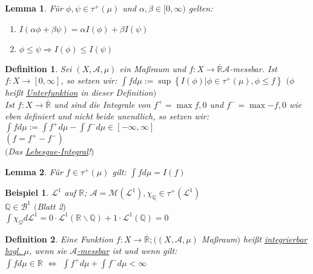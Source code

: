 \documentclass[11pt]{memoir}
\theoremstyle{changebreak}
\newtheorem{Definition}{Definition}[chapter]
\newtheorem{Beispiel}{Beispiel}[chapter]
\newtheorem{Lemma}{Lemma}[chapter]
\begin{document}
\begin{Lemma}
Für $\phi, \psi \in \tau	^+(\mu)$ und $\alpha, \beta \in [0, \infty)$ gelten:
\begin{enumerate}
	\item $I(\alpha\phi + \beta\psi) = \alpha I(\phi) + \beta I(\psi)$
	\item $\phi \leq \psi \Rightarrow I(\phi) \leq I(\psi)$
\end{enumerate}
\end{Lemma}


\begin{Definition}
Sei $(X, \mathscr A, \mu)$ ein Maßraum und $f: X \rightarrow \overline{\mathbb R} \mathscr A$-messbar. Ist $f: X \rightarrow [0, \infty]$, so setzen wir:
$\int f d\mu := \sup\left\{I(\phi) | \phi \in \tau^+(\mu), \phi \leq f\right\}$ $(\phi$ heißt \underline{Unterfunktion} in dieser Definition$)$ \\

Ist $f: X \rightarrow \overline{\mathbb R}$ und sind die Integrale von $f^+ = \max{f, 0}$ und $f^- = \max{-f, 0}$ wie eben definiert und nicht beide unendlich, so setzen wir: \\
$\int f d\mu := \int f^+ d\mu - \int f^- d\mu \in [-\infty, \infty]$ \\
$(f = f^+ - f^-)$ \\
$($Das \underline{Lebesgue-Integral}!$)$
\end{Definition}

\begin{Lemma}
Für $f \in \tau^+ (\mu)$ gilt: $\int f d\mu = I(f)$
\end{Lemma}

\begin{Beispiel}
$\mathscr L^1$ auf $\mathbb R$; $\mathscr A = \mathscr M(\mathscr L^1), \chi_\mathbb Q \in \tau^+ (\mathscr L^1)$ \\
$\mathbb Q \in \mathscr B^1$ $($Blatt 2$)$ \\
$\int \chi_\mathscr Q d\mathscr L^1 = 0 \cdotp \mathscr L^1(\mathbb R \backslash \mathbb Q) + 1 \cdotp \mathscr L^1(\mathbb Q) = 0$
\end{Beispiel}

\begin{Definition}
Eine Funktion $f: X \rightarrow \overline{\mathbb R}; ((X, \mathscr A, \mu)$ Maßraum$)$ heißt \underline{integrierbar bzgl. $\mu$}, wenn sie \underline{$\mathscr A$-messbar} ist und wenn gilt: \\
$\int f d\mu \in \mathbb R$ $\Leftrightarrow$ $\int f^+ d\mu + \int f^- d\mu < \infty$
\end{Definition}
\end{document}
